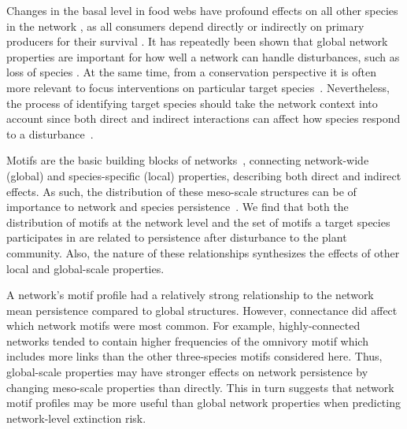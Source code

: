 \documentclass[12pt]{article}
\begin{document}
\begin{spacing}{2.0}


Changes in the basal level in food webs have profound effects on all other species in the network \citep{}, as all consumers depend directly or indirectly on primary producers for their survival \citep{}. It has repeatedly been shown that global network properties are important for how well a network can handle disturbances, such as loss of species \citep{Eklof2006, Dunne2002}. At the same time, from a conservation perspective it is often more relevant to focus interventions on particular target species~\citep{}. Nevertheless, the process of identifying target species should take the network context into account since both direct and indirect interactions can affect how species respond to a disturbance~\citep{}. 

Motifs are the basic building blocks of networks~\citep{Milo2002}, connecting network-wide (global) and species-specific (local) properties, describing both direct and indirect effects. As such, the distribution of these meso-scale structures can be of importance to network and species persistence~\citep{}.
We find that both the distribution of motifs at the network level and the set of motifs a target species participates in are related to persistence after disturbance to the plant community. Also, the nature of these relationships synthesizes the effects of other local and global-scale properties.

A network's motif profile had a relatively strong relationship to the network mean persistence compared to global structures. However, connectance did affect which network motifs were most common. For example, highly-connected networks tended to contain higher frequencies of the omnivory motif which includes more links than the other three-species motifs considered here.
Thus, global-scale properties may have stronger effects on network persistence by changing meso-scale properties than directly.
This in turn suggests that network motif profiles may be more useful than global network properties when predicting network-level extinction risk.


\end{spacing}
\end{document}
